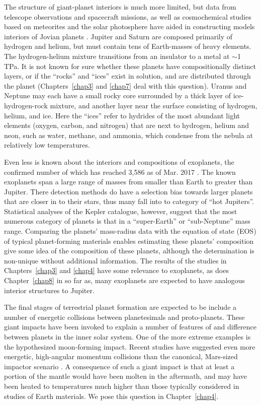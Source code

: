 The structure of giant-planet interiors is much more limited, but data from
telescope observations and spacecraft missions, as well as cosmochemical
studies based on meteorites and the solar photosphere have aided in
constructing models interiors of Jovian planets \cite{Guillot2004}. Jupiter and
Saturn are composed primarily of hydrogen and helium, but must contain tens of
Earth-masses of heavy elements. The hydrogen-helium mixture transitions from an
insulator to a metal at $\sim$1 TPa. It is not known for sure whether these
planets have compositionally distinct layers, or if the ``rocks'' and ``ices''
exist in solution, and are distributed through the planet (Chapters~\ref{chap3}
and \ref{chap7} deal with this question).  Uranus and Neptune may each have a
small rocky core surrounded by a thick layer of ice-hydrogen-rock mixture, and
another layer near the surface consisting of hydrogen, helium, and ice.  Here
the ``ices'' refer to hydrides of the most abundant light elements (oxygen,
carbon, and nitrogen) that are next to hydrogen, helium and neon, such as
water, methane, and ammonia, which condense from the nebula at relatively low
temperatures. 

Even less is known about the interiors and compositions of exoplanets, the
confirmed number of which has reached 3,586 as of Mar. 2017 \cite{Schneider2011}.
The known exoplanets span a large range of masses from smaller than Earth to
greater than Jupiter.  There detection methods do have a selection bias towards
larger planets that are closer in to their stars, thus many fall into to
category of ``hot Jupiters''. Statistical analyses of the Kepler catalogue,
however, suggest that the most numerous category of planets is that in a
``super-Earth'' or ``sub-Neptune''  mass range. Comparing the planets'
mass-radius data with the equation of state (EOS) of typical planet-forming
materials enables estimating these planets' composition \cite{Seager2007} give
some idea of the composition of these planets, although the determination is
non-unique without additional information. The results of the studies in
Chapters~\ref{chap3} and \ref{chap4} have some relevance to exoplanets, as does
Chapter~\ref{chap8} in so far as, many exoplanets are expected to have
analogous interior structures to Jupiter.

The final stages of terrestrial planet formation are expected to be include 
a number of energetic collisions between planetesimals and proto-planets. 
These giant impacts have been invoked to explain a number of features of and
difference between planets in the inner solar system. One of the more extreme
examples is the hypothesized moon-forming impact. Recent studies have suggested
even more energetic, high-angular momentum collisions \citep{Cuk2012} than the 
canonical, Mars-sized impactor scenario \citep{canup2004}. A consequence of 
such a giant impact is that at least a portion of the mantle would have been
molten in the aftermath, and may have been heated to temperatures
much higher than those typically considered in studies of Earth materials. 
We pose this question in Chapter~\ref{chap4}.

